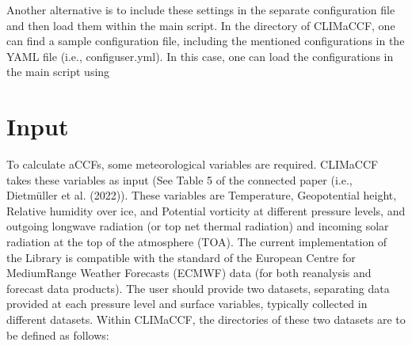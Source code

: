 \documentclass[a4paper,11pt,english]{sphinxmanual}
\begin{document}
\sphinxAtStartPar
Another alternative is to include these settings in the separate configuration file and then load them within the main script.
In the directory of CLIMaCCF, one can find a sample configuration file, including the mentioned configurations in the YAML file (i.e., config\sphinxhyphen{}user.yml). In this case, one can load the configurations in the main script using

\begin{sphinxVerbatim}[commandchars=\\\{\}]
       
\end{sphinxVerbatim}


\section{Input}
\label{\detokenize{gStarted:input}}
\sphinxAtStartPar
To calculate aCCFs, some meteorological variables are required. CLIMaCCF takes these variables as input (See Table 5 of the connected paper (i.e., Dietmüller et al. (2022)).
These variables are Temperature, Geopotential height, Relative humidity over ice, and Potential vorticity at different pressure levels,
and outgoing longwave radiation (or top net thermal radiation) and incoming solar radiation at the top of the atmosphere (TOA).
The current implementation of the Library is compatible with the standard of the European Centre for Medium\sphinxhyphen{}Range Weather Forecasts (ECMWF) data (for both reanalysis and forecast data products).
The user should provide two datasets, separating data provided at each pressure level and surface variables, typically collected in different datasets. Within CLIMaCCF, the directories of these two datasets are to be defined as follows:

\begin{sphinxVerbatim}[commandchars=\\\{\}]
  
\PYG{p}{[}\PYG{p}{]}   

\PYG{p}{[}\PYG{p}{]}   
\end{sphinxVerbatim}
\end{document}
